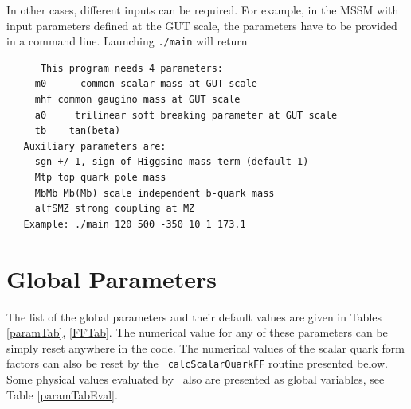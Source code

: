 \documentclass[12pt,a4paper]{article}
\begin{document}
In other cases, different inputs can be required. For example, in the MSSM with input parameters defined at the GUT scale,
the parameters have to be provided in a command line. Launching \verb|./main| will return 
\begin{verbatim}
      This program needs 4 parameters:
     m0      common scalar mass at GUT scale
     mhf common gaugino mass at GUT scale
     a0     trilinear soft breaking parameter at GUT scale
     tb    tan(beta)
   Auxiliary parameters are:
     sgn +/-1, sign of Higgsino mass term (default 1)
     Mtp top quark pole mass
     MbMb Mb(Mb) scale independent b-quark mass
     alfSMZ strong coupling at MZ
   Example: ./main 120 500 -350 10 1 173.1
\end{verbatim}



\section{Global Parameters}
\label{sec:global_parameters}

 The list of the
global parameters  and their default values  are given  in Tables
\ref{paramTab}, \ref{FFTab}. 
The numerical value for any of these parameters can be simply reset anywhere in the code. 
The numerical values of  the scalar quark form factors can also be reset by the {\tt
calcScalarQuarkFF} routine presented below. Some physical values  evaluated by \micro\  also are presented as global variables,  see Table \ref{paramTabEval}. 
\end{document}
